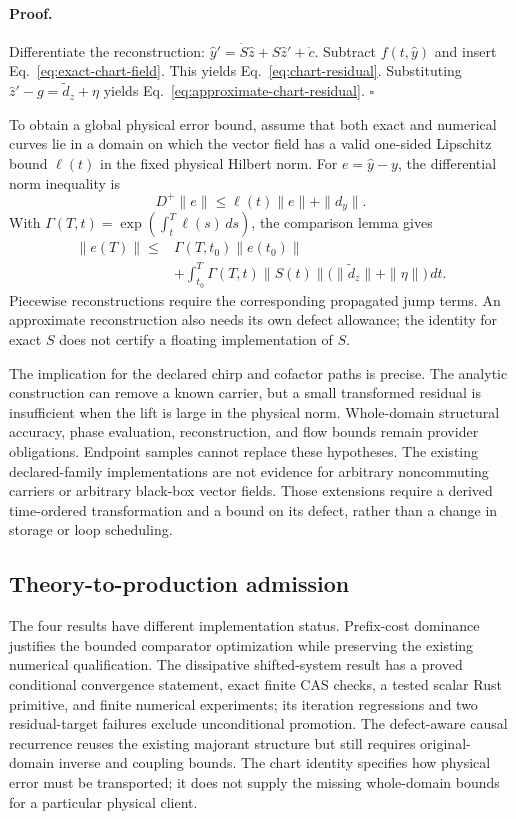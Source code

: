 \paragraph{Proof.}
Differentiate the reconstruction:
$\widehat y'=\dot S\widehat z+S\widehat z'+\dot c$.
Subtract $f(t,\widehat y)$ and insert Eq.~\eqref{eq:exact-chart-field}.
This yields Eq.~\eqref{eq:chart-residual}.  Substituting
$\widehat z'-g=\widetilde d_z+\eta$ yields
Eq.~\eqref{eq:approximate-chart-residual}.
\hfill$\square$

To obtain a global physical error bound, assume that both exact and numerical
curves lie in a domain on which the vector field has a valid one-sided
Lipschitz bound $\ell(t)$ in the fixed physical Hilbert norm.  For
$e=\widehat y-y$, the differential norm inequality is
\begin{equation}
 D^+\|e\|\leq\ell(t)\|e\|+\|d_y\|.
\end{equation}
With $\Gamma(T,t)=\exp(\int_t^T\ell(s)\,ds)$, the comparison lemma gives
\begin{align}
 \|e(T)\|\leq{}&\Gamma(T,t_0)\|e(t_0)\|\nonumber\\
 &+\int_{t_0}^{T}\Gamma(T,t)\|S(t)\|
       \bigl(\|\widetilde d_z\|+\|\eta\|\bigr)\,dt.
 \label{eq:chart-global-bound}
\end{align}
Piecewise reconstructions require the corresponding propagated jump terms.
An approximate reconstruction also needs its own defect allowance; the
identity for exact $S$ does not certify a floating implementation of $S$.

The implication for the declared chirp and cofactor paths is precise.
The analytic construction can remove a known carrier, but a small
transformed residual is insufficient when the lift is large in the physical
norm.  Whole-domain structural accuracy, phase evaluation, reconstruction,
and flow bounds remain provider obligations.  Endpoint samples cannot replace
these hypotheses.  The existing declared-family implementations are not
evidence for arbitrary noncommuting carriers or arbitrary black-box vector
fields.  Those extensions require a derived time-ordered transformation and
a bound on its defect, rather than a change in storage or loop scheduling.

\subsection{Theory-to-production admission}

The four results have different implementation status.  Prefix-cost
dominance justifies the bounded comparator optimization while preserving the
existing numerical qualification.  The dissipative shifted-system result
has a proved conditional convergence statement, exact finite CAS checks, a
tested scalar Rust primitive, and finite numerical experiments; its iteration
regressions and two residual-target failures exclude unconditional promotion.
The defect-aware causal recurrence reuses the existing majorant structure
but still requires original-domain inverse and coupling bounds.  The chart
identity specifies how physical error must be transported; it does not supply
the missing whole-domain bounds for a particular physical client.

